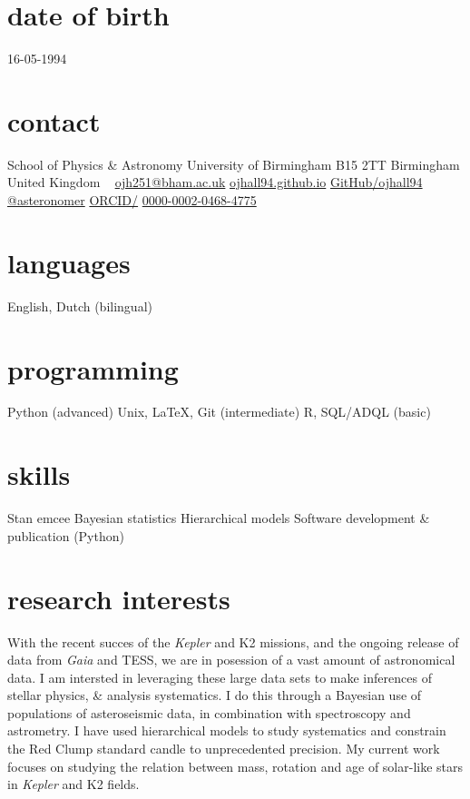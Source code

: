 \documentclass[]{k-cv} %
\begin{document}


\begin{aside} %
\section{date of birth}
\color{gray}16-05-1994
\section{contact}
School of Physics \& Astronomy
University of Birmingham
B15 2TT
Birmingham
United Kingdom
~
\href{mailto:ojh251@student.bham.ac.uk}{ojh251@bham.ac.uk}
\href{http://www.ojhall94.github.io}{ojhall94.github.io}
\href{http://www.github.com/ojhall94}{GitHub/ojhall94}
\href{http://www.twitter.com/asteronomer}{@asteronomer}
\href{http://www.orcid.com/0000-0002-0468-4775}{ORCID/}
\href{http://www.orcid.com/0000-0002-0468-4775}{0000-0002-0468-4775}
\section{languages}
English, Dutch (bilingual)
\section{programming}
Python (advanced)
Unix, LaTeX, Git (intermediate)
R, SQL/ADQL (basic)
\section{skills}
Stan
emcee
Bayesian statistics
Hierarchical models
Software development \& publication (Python)
\end{aside}

\section{research interests}
\bodyfont With the recent succes of the \textit{Kepler} and K2 missions, and the ongoing release of data from \textit{Gaia} and TESS, we are in posession of a vast amount of astronomical data. I am intersted in leveraging these large data sets to make inferences of stellar physics, \& analysis systematics. I do this through a Bayesian use of populations of asteroseismic data, in combination with spectroscopy and astrometry. I have used hierarchical models to study systematics and constrain the Red Clump standard candle to unprecedented precision. My current work focuses on studying the relation between mass, rotation and age of solar-like stars in \textit{Kepler} and K2 fields.
\end{document}
